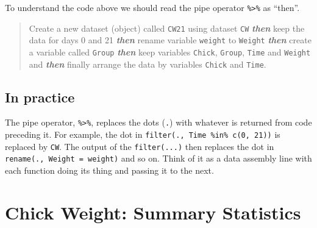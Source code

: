 \documentclass[a4paper,9pt,twocolumn,twoside,printwatermark=false]{pinp}
\begin{document}
To understand the code above we should read the pipe operator
\texttt{\%\textgreater{}\%} as ``then''.

\begin{quote}
Create a new dataset (object) called \texttt{CW21} using dataset
\texttt{CW} \textbf{\emph{then}} keep the data for days 0 and 21
\textbf{\emph{then}} rename variable \texttt{weight} to \texttt{Weight}
\textbf{\emph{then}} create a variable called \texttt{Group}
\textbf{\emph{then}} keep variables \texttt{Chick}, \texttt{Group},
\texttt{Time} and \texttt{Weight} and \textbf{\emph{then}} finally
arrange the data by variables \texttt{Chick} and \texttt{Time}.
\end{quote}

\subsection{In practice}\label{in-practice}

\begin{Shaded}
\end{Shaded}

The pipe operator, \texttt{\%\textgreater{}\%}, replaces the dots
(\texttt{.}) with whatever is returned from code preceding it. For
example, the dot in \texttt{filter(.,\ Time\ \%in\%\ c(0,\ 21))} is
replaced by \texttt{CW}. The output of the \texttt{filter(...)} then
replaces the dot in \texttt{rename(.,\ Weight\ =\ weight)} and so on.
Think of it as a data assembly line with each function doing its thing
and passing it to the next.

\section{Chick Weight: Summary
Statistics}\label{chick-weight-summary-statistics}
\end{document}
